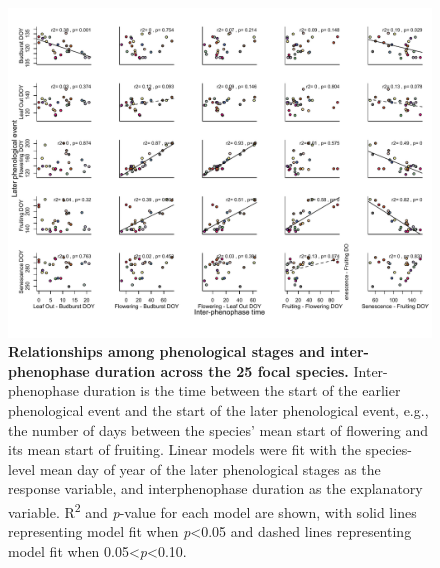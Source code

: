 \documentclass{article}
\begin{document}
\begin{figure}[h]
  \centering
  \includegraphics{../analyses/figures/adj_stagesmegaplot_col2.pdf}
  \caption{\textbf{Relationships among phenological stages and inter-phenophase duration across the 25 focal species.} Inter-phenophase duration is the time between the start of the earlier phenological event and the start of the later phenological event, e.g., the number of days between the species' mean start of flowering and its mean start of fruiting. Linear models were fit with the species-level mean day of year of the later phenological stages as the response variable, and interphenophase duration as the explanatory variable. R\textsuperscript{2} and \textit{p}-value for each model are shown, with solid lines representing model fit when \textit{p}<0.05 and dashed lines representing model fit when 0.05<\textit{p}<0.10.}
  \label{fig:inter}
   \end{figure}


\end{document}
